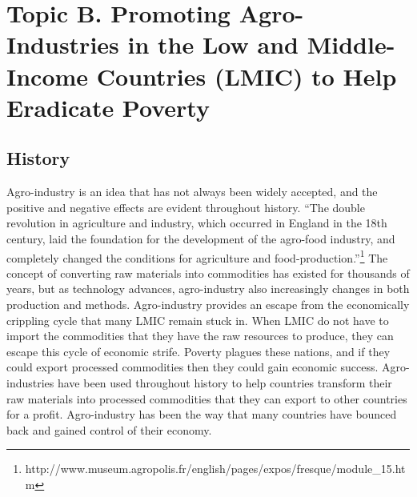 \documentclass[10pt, letterpaper]{article}
\begin{document}
\newpage
\section{Topic B. Promoting Agro-Industries in the Low and Middle-Income
Countries (LMIC) to Help Eradicate Poverty}

\subsection{History}

Agro-industry is an idea that has not always been widely accepted, and
the positive and negative effects are evident throughout history. ``The
double revolution in agriculture and industry, which occurred in England
in the 18th century, laid the foundation for the development of the
agro-food industry, and completely changed the conditions for
agriculture and food-production.''\footnote{http://www.museum.agropolis.fr/english/pages/expos/fresque/module\_15.htm}
The concept of converting raw materials into commodities has existed for
thousands of years, but as technology advances, agro-industry also
increasingly changes in both production and methods. Agro-industry
provides an escape from the economically crippling cycle that many LMIC
remain stuck in. When LMIC do not have to import the commodities that
they have the raw resources to produce, they can escape this cycle of
economic strife. Poverty plagues these nations, and if they could export
processed commodities then they could gain economic success.
Agro-industries have been used throughout history to help countries
transform their raw materials into processed commodities that they can
export to other countries for a profit. Agro-industry has been the way
that many countries have bounced back and gained control of their
economy. \\
\end{document}
